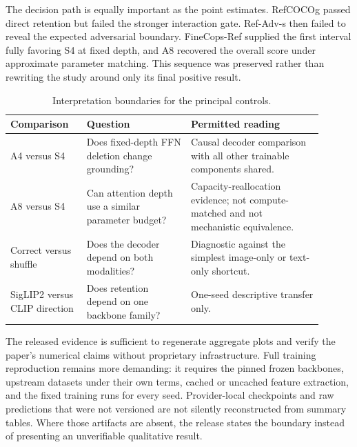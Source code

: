 \documentclass[10pt]{article}
\begin{document}
\begin{table}[H]
\centering
\small
\caption{Frozen headline comparisons. Positive A4-S4 values favor the attention-only decoder.}
\resizebox{\linewidth}{!}{}
\label{tab:appendix-main-results}
\end{table}

The decision path is equally important as the point estimates. RefCOCOg passed
direct retention but failed the stronger interaction gate. Ref-Adv-s then
failed to reveal the expected adversarial boundary. FineCops-Ref supplied the
first interval fully favoring S4 at fixed depth, and A8 recovered the overall
score under approximate parameter matching. This sequence was preserved rather
than rewriting the study around only its final positive result.

\begin{table}[H]
\centering
\small
\setlength{\tabcolsep}{5pt}
\begin{tabular}{>{\raggedright\arraybackslash}p{0.22\linewidth}>{\raggedright\arraybackslash}p{0.30\linewidth}>{\raggedright\arraybackslash}p{0.38\linewidth}}
\toprule
Comparison & Question & Permitted reading \\
\midrule
A4 versus S4 & Does fixed-depth FFN deletion change grounding? & Causal decoder comparison with all other trainable components shared. \\
A8 versus S4 & Can attention depth use a similar parameter budget? & Capacity-reallocation evidence; not compute-matched and not mechanistic equivalence. \\
Correct versus shuffle & Does the decoder depend on both modalities? & Diagnostic against the simplest image-only or text-only shortcut. \\
SigLIP2 versus CLIP direction & Does retention depend on one backbone family? & One-seed descriptive transfer only. \\
\bottomrule
\end{tabular}
\caption{Interpretation boundaries for the principal controls.}
\label{tab:interpretation-boundaries}
\end{table}

The released evidence is sufficient to regenerate aggregate plots and verify
the paper's numerical claims without proprietary infrastructure. Full training
reproduction remains more demanding: it requires the pinned frozen backbones,
upstream datasets under their own terms, cached or uncached feature extraction,
and the fixed training runs for every seed. Provider-local checkpoints and raw
predictions that were not versioned are not silently reconstructed from summary
tables. Where those artifacts are absent, the release states the boundary
instead of presenting an unverifiable qualitative result.
\end{document}

